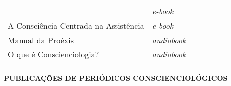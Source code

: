 \documentclass[
]{article}
\begin{document}
\begin{longtable}[]{@{}
  >{\raggedright\arraybackslash}p{}
  >{\raggedright\arraybackslash}p{}@{}}
\begin{minipage}[b]{\linewidth}
\end{minipage} & \begin{minipage}[b]{\linewidth}\raggedright
\emph{e-book}
\end{minipage} \\
\begin{minipage}[b]{\linewidth}\raggedright
A Consciência Centrada na Assistência
\end{minipage} & \begin{minipage}[b]{\linewidth}\raggedright
\emph{e-book}
\end{minipage} \\
\begin{minipage}[b]{\linewidth}\raggedright
Manual da Proéxis
\end{minipage} & \begin{minipage}[b]{\linewidth}\raggedright
\emph{audiobook}
\end{minipage} \\
\begin{minipage}[b]{\linewidth}\raggedright
O que é Conscienciologia?
\end{minipage} & \begin{minipage}[b]{\linewidth}\raggedright
\emph{audiobook}
\end{minipage} \\
\midrule\noalign{}
\endhead
\bottomrule\noalign{}
\endlastfoot
\end{longtable}

\textbf{PUBLICAÇÕES DE PERIÓDICOS CONSCIENCIOLÓGICOS}
\end{document}
